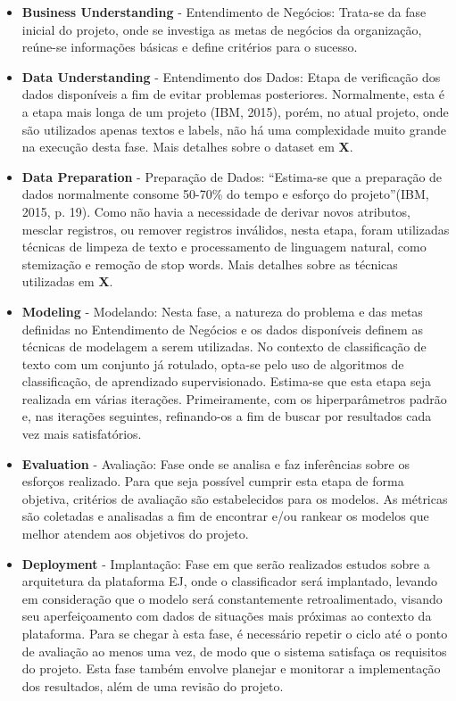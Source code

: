 \begin{itemize}
    \item \textbf{Business Understanding} - Entendimento de Negócios: Trata-se da fase inicial do projeto, onde se investiga as metas de negócios da organização, reúne-se informações básicas e define critérios para o sucesso.
    \item \textbf{Data Understanding} - Entendimento dos Dados: Etapa de verificação dos dados disponíveis a fim de evitar problemas posteriores. Normalmente, esta é a etapa mais longa de um projeto (IBM, 2015), porém, no atual projeto, onde são utilizados apenas textos e labels, não há uma complexidade muito grande na execução desta fase. Mais detalhes sobre o dataset em \textbf{X}.
    \item \textbf{Data Preparation} - Preparação de Dados: “Estima-se que a preparação de dados normalmente consome 50-70\% do tempo e esforço do projeto”(IBM, 2015, p. 19). Como não havia a necessidade de derivar novos atributos, mesclar registros, ou remover registros inválidos, nesta etapa, foram utilizadas técnicas de limpeza de texto e processamento de linguagem natural, como stemização e remoção de stop words. Mais detalhes sobre as técnicas utilizadas em \textbf{X}.
    \item \textbf{Modeling} - Modelando: Nesta fase, a natureza do problema e das metas definidas no Entendimento de Negócios e os dados disponíveis definem as técnicas de modelagem a serem utilizadas. No contexto de classificação de texto com um conjunto já rotulado, opta-se pelo uso de algoritmos de classificação, de aprendizado supervisionado. Estima-se que esta etapa seja realizada em várias iterações. Primeiramente, com os hiperparâmetros padrão e, nas iterações seguintes, refinando-os a fim de buscar por resultados cada vez mais satisfatórios.
    \item \textbf{Evaluation} - Avaliação: Fase onde se analisa e faz inferências sobre os esforços realizado. Para que seja possível cumprir esta etapa de forma objetiva, critérios de avaliação são estabelecidos para os modelos. As métricas são coletadas e analisadas a fim de encontrar e/ou rankear os modelos que melhor atendem aos objetivos do projeto.
    \item \textbf{Deployment} - Implantação: Fase em que serão realizados estudos sobre a arquitetura da plataforma EJ, onde o classificador será implantado, levando em consideração que o modelo será constantemente retroalimentado, visando seu aperfeiçoamento com dados de situações mais próximas ao contexto da plataforma. Para se chegar à esta fase, é necessário repetir o ciclo até o ponto de avaliação ao menos uma vez, de modo que o sistema satisfaça os requisitos do projeto. Esta fase também envolve planejar e monitorar a implementação dos resultados, além de uma revisão do projeto.
\end{itemize}

